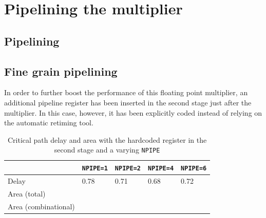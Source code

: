 \chapter{Pipelining the multiplier}
\section{Pipelining}

\section{Fine grain pipelining}
In order to further boost the performance of this floating point multiplier, an additional pipeline register has been inserted in the second stage just after the multiplier. In this case, however, it has been explicitly coded instead of relying on the automatic retiming tool.
\begin{table}
	
	\begin{tabular}{|l|l|l|l|l|}
	\hline
	&\texttt{NPIPE=1} & \texttt{NPIPE=2} & \texttt{NPIPE=4} & \texttt{NPIPE=6}\\\hline
	Delay & 0.78 & 0.71 & 0.68 & 0.72 \\\hline
	Area (total) & & & & \\\hline
	Area (combinational) & & & & \\\hline
	\end{tabular}

	\caption{Critical path delay and area with the hardcoded register in the second stage and a varying \texttt{NPIPE}}
	\label{tab:stage2}
\end{table}

